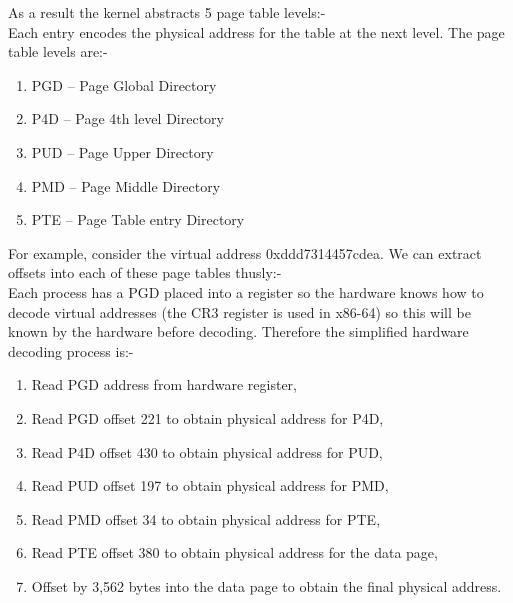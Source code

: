 As a result the kernel abstracts 5 page table levels:-\\



Each entry encodes the physical address for the table at the next level. The
page table levels are:-\\
\clearpage

\begin{enumerate}
\item PGD -- Page Global Directory
\item P4D -- Page 4th level Directory
\item PUD -- Page Upper Directory
\item PMD -- Page Middle Directory
\item PTE -- Page Table entry Directory
\end{enumerate}

For example, consider the virtual address 0xddd7314457cdea. We can extract
offsets into each of these page tables thusly:-\\



Each process has a PGD placed into a register so the hardware knows how to
decode virtual addresses (the CR3 register is used in x86-64) so this will be
known by the hardware before decoding. Therefore the simplified hardware
decoding process is:-

\begin{enumerate}
\item Read PGD address from hardware register,
\item Read PGD offset 221 to obtain physical address for P4D,
\item Read P4D offset 430 to obtain physical address for PUD,
\item Read PUD offset 197 to obtain physical address for PMD,
\item Read PMD offset 34 to obtain physical address for PTE,
\item Read PTE offset 380 to obtain physical address for the data page,
\item Offset by 3,562 bytes into the data page to obtain the final physical address.
\end{enumerate}
